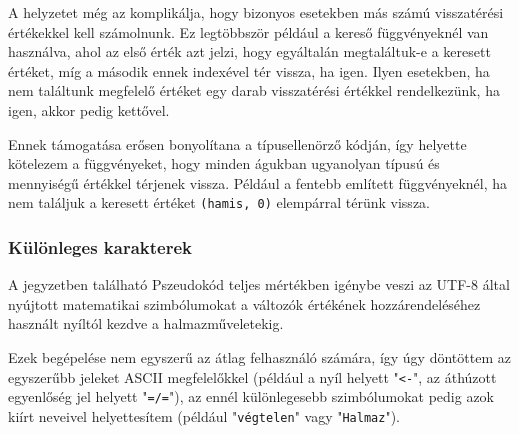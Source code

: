 A helyzetet még az komplikálja, hogy bizonyos esetekben más számú visszatérési értékekkel kell számolnunk. Ez legtöbbször például a kereső függvényeknél van használva, ahol az első érték azt jelzi, hogy egyáltalán megtaláltuk-e a keresett értéket, míg a második ennek indexével tér vissza, ha igen. Ilyen esetekben, ha nem találtunk megfelelő értéket egy darab visszatérési értékkel rendelkezünk, ha igen, akkor pedig kettővel.

Ennek támogatása erősen bonyolítana a típusellenörző kódján, így helyette kötelezem a függvényeket, hogy minden águkban ugyanolyan típusú és mennyiségű értékkel térjenek vissza. Például a fentebb említett függvényeknél, ha nem találjuk a keresett értéket \texttt{(hamis, 0)} elempárral térünk vissza.

\subsubsection{Különleges karakterek}

A jegyzetben található Pszeudokód teljes mértékben igénybe veszi az UTF-8 által nyújtott matematikai szimbólumokat a változók értékének hozzárendeléséhez használt nyíltól kezdve a halmazműveletekig.

Ezek begépelése nem egyszerű az átlag felhasználó számára, így úgy döntöttem az egyszerűbb jeleket ASCII megfelelőkkel (például a nyíl helyett "\texttt{<-}", az áthúzott egyenlőség jel helyett "\texttt{=/=}"), az ennél különlegesebb szimbólumokat pedig azok kiírt neveivel helyettesítem (például "\texttt{végtelen}" vagy "\texttt{Halmaz}").
